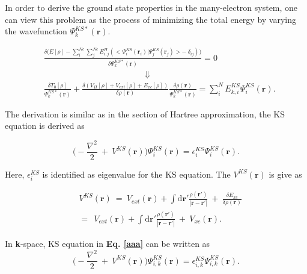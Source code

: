 \documentclass[a4paper, 12pt, titlepage,oneside,drop]{kthesis}
\begin{document}
In order to derive the ground state properties in the many-electron system, one can view this problem as the process of minimizing the total energy by varying the wavefunction $\Psi^{{KS}*}_{{k}}(\textbf{r})$. 

\begin{equation}\begin{split}\label{ks11}
& \frac{ \delta  \Big(E[\rho] - \sum\limits_{i}^{Ne} \sum\limits_{j}^{Ne} E_{i,j}^{H} (<\Psi^{{KS}}_{{i}}(\textbf{r}_i) | \Psi^{{KS}}_{{j}}(\textbf{r}_j)> -\ \delta_{ij})\Big)}{\delta \Psi^{{KS}*}_{{k}}(\textbf{r})}  = 0 \\
&  \qquad \qquad \qquad  \qquad \qquad \qquad  \Downarrow \\
& \frac{\delta T_{0}[\rho]}{\Psi^{{KS}*}_{{k}}(\textbf{r})} + \frac{\delta(V_{H}[\rho]  + V_{ext}[\rho] + E_{xc}[\rho])}{\delta \rho(\textbf{r})} \frac{\delta \rho(\textbf{r})}{\Psi^{{KS}*}_{{k}}(\textbf{r})} 
= \sum\limits_i^{{N}} E_{k,i}^{KS} \Psi^{{KS}}_{{i}}(\textbf{r}).
\end{split}
\end{equation}


The derivation is similar as in the section of Hartree approximation, the KS equation is derived as 

\begin{equation}\label{aaa}
 \Big(-\frac{\nabla^{2}}{2}\ + \ V^{KS}(\textbf{r})\Big) \Psi^{{KS}}_{{i}}(\textbf{r}) = \epsilon^{{KS}}_{{i}} \Psi^{{KS}}_{{i}}(\textbf{r}).
\end{equation}

Here, $\epsilon^{{KS}}_{{i}}$ is identified as eigenvalue for the KS equation. The $V^{KS}(\textbf{r})$ is give as

\begin{equation}\begin{split}\label{xiahunao}
&\ V^{KS}(\textbf{r}) \ = \ V_{ext}(\textbf{r}) + \int \mathrm{d}{\textbf{r}'}  \frac{\rho(\textbf{r}')}{|{\textbf{r}}-{\textbf{r}}'|} \ + \ \frac{\delta{E_{xc}}}{\delta{\rho(\textbf{r})}} \\
&\ = \ \ V_{ext}(\textbf{r}) + \int \mathrm{d}{\textbf{r}'}  \frac{\rho(\textbf{r}')}{|{\textbf{r}}-{\textbf{r}}'|} \ + \ V_{xc}(\textbf{r}).
\end{split}
\end{equation}

In \textbf{k}-space, KS equation in \textbf{Eq. \ref{aaa}} can be written as
\begin{equation}\label{aaa111}
 \Big(-\frac{\nabla^{2}}{2}\ + \ V^{KS}(\textbf{r})\Big) \Psi^{{KS}}_{{i,k}}(\textbf{r}) = \epsilon^{{KS}}_{{i,k}} \Psi^{{KS}}_{{i,k}}(\textbf{r}).
\end{equation}
\end{document}
